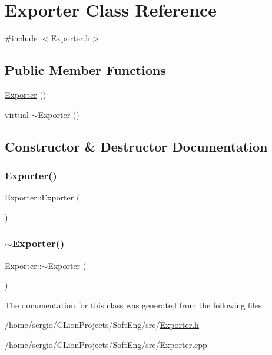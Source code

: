 \hypertarget{class_exporter}{}\section{Exporter Class Reference}
\label{class_exporter}


{\ttfamily \#include $<$Exporter.\+h$>$}

\subsection*{Public Member Functions}
\begin{DoxyCompactItemize}
\item 
\hyperlink{class_exporter_a2a977cb5ac8f637fcb570e73f650eca0}{Exporter} ()
\item 
virtual \hyperlink{class_exporter_a44f24686958e01a543fd8b68b392658a}{$\sim$\+Exporter} ()
\end{DoxyCompactItemize}


\subsection{Constructor \& Destructor Documentation}
\mbox{\label{class_exporter_a2a977cb5ac8f637fcb570e73f650eca0}} 
\subsubsection{\texorpdfstring{Exporter()}{Exporter()}}
{\footnotesize\ttfamily Exporter\+::\+Exporter (\begin{DoxyParamCaption}{ }\end{DoxyParamCaption})}

\mbox{\label{class_exporter_a44f24686958e01a543fd8b68b392658a}} 
\subsubsection{\texorpdfstring{$\sim$\+Exporter()}{~Exporter()}}
{\footnotesize\ttfamily Exporter\+::$\sim$\+Exporter (\begin{DoxyParamCaption}{ }\end{DoxyParamCaption})\hspace{0.3cm}{\ttfamily [virtual]}}



The documentation for this class was generated from the following files\+:\begin{DoxyCompactItemize}
\item 
/home/sergio/\+C\+Lion\+Projects/\+Soft\+Eng/src/\hyperlink{_exporter_8h}{Exporter.\+h}\item 
/home/sergio/\+C\+Lion\+Projects/\+Soft\+Eng/src/\hyperlink{_exporter_8cpp}{Exporter.\+cpp}\end{DoxyCompactItemize}
